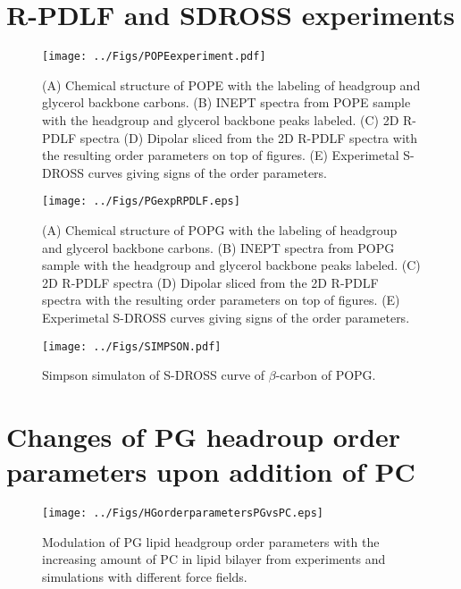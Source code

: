 \documentclass[journal=jpcbfk]{achemso}
\begin{document}
\clearpage
\section{R-PDLF and SDROSS experiments}

\begin{figure}[]
  \texttt{[image: ../Figs/POPEexperiment.pdf]}
  \caption{\label{POPEspectra}
    (A) Chemical structure of POPE with the labeling of headgroup and glycerol backbone carbons.
    (B) INEPT spectra from POPE sample with the headgroup and glycerol backbone peaks labeled.
    (C) 2D R-PDLF spectra
    (D) Dipolar sliced from the  2D R-PDLF spectra with the resulting order parameters on top of figures.
    (E) Experimetal S-DROSS curves giving signs of the order parameters.
  }
\end{figure}

\begin{figure}[]
  \texttt{[image: ../Figs/PGexpRPDLF.eps]}
  \caption{\label{POPGspectra}
    (A) Chemical structure of POPG with the labeling of headgroup and glycerol backbone carbons.
    (B) INEPT spectra from POPG sample with the headgroup and glycerol backbone peaks labeled.
    (C) 2D R-PDLF spectra
    (D) Dipolar sliced from the  2D R-PDLF spectra with the resulting order parameters on top of figures.
    (E) Experimetal S-DROSS curves giving signs of the order parameters.
  }
\end{figure}

\begin{figure}[]
  \texttt{[image: ../Figs/SIMPSON.pdf]}
  \caption{\label{POPGsimpson}
    Simpson simulaton of S-DROSS curve of $\beta$-carbon of POPG.
  }
\end{figure}

\clearpage

\section{Changes of PG headroup order parameters upon addition of PC}

\begin{figure}[]
  \centering
  \texttt{[image: ../Figs/HGorderparametersPGvsPC.eps]}
  \caption{\label{HGorderparametersPGvsPC}
    Modulation of PG lipid headgroup order parameters with the increasing amount of PC in lipid bilayer
    from experiments \cite{borle85,macdonald87} and simulations with different force fields.
  }
\end{figure}
\end{document}
